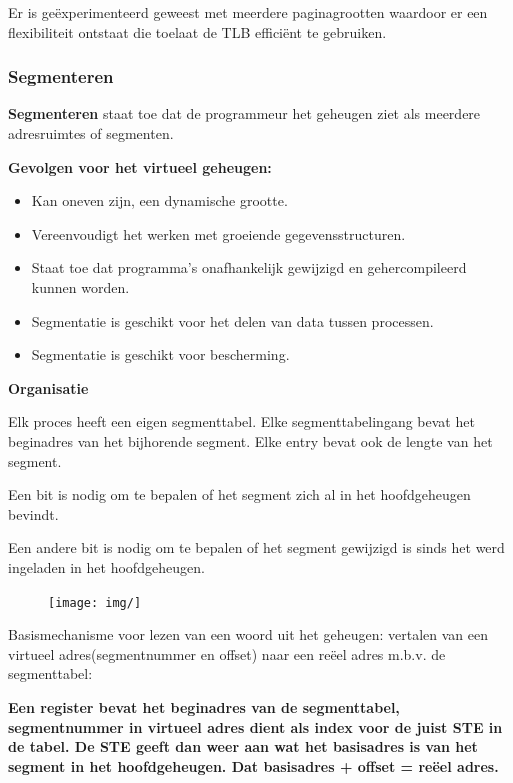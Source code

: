 Er is geëxperimenteerd geweest met meerdere paginagrootten waardoor er een flexibiliteit ontstaat die toelaat de TLB efficiënt te gebruiken.

\subsubsection{Segmenteren}

\textbf{Segmenteren} staat toe dat de programmeur het geheugen ziet als meerdere adresruimtes of segmenten.

\textbf{Gevolgen voor het virtueel geheugen:}

\begin{itemize}
\item Kan oneven zijn, een dynamische grootte.
\item Vereenvoudigt het werken met groeiende gegevensstructuren.
\item Staat toe dat programma’s onafhankelijk gewijzigd en gehercompileerd kunnen worden.
\item Segmentatie is geschikt voor het delen van data tussen processen.
\item Segmentatie is geschikt voor bescherming.
\end{itemize}

\textbf{Organisatie}

Elk proces heeft een eigen segmenttabel. Elke segmenttabelingang bevat het beginadres van het bijhorende segment. Elke entry bevat ook de lengte van het segment.

Een bit is nodig om te bepalen of het segment zich al in het hoofdgeheugen bevindt.

Een andere bit is nodig om te bepalen of het segment gewijzigd is sinds het werd ingeladen in het hoofdgeheugen.


\begin{figure}[htp]
    \centering
            \texttt{[image: img/]}
        \caption{}
    \label{fig:}
\end{figure}

Basismechanisme voor lezen van een woord uit het geheugen: vertalen van een virtueel adres(segmentnummer en offset) naar een reëel adres m.b.v. de segmenttabel:

\textbf{Een register bevat het beginadres van de segmenttabel, segmentnummer in virtueel adres dient als index voor de juist STE in de tabel. De STE geeft dan weer aan wat het basisadres is van het segment in het hoofdgeheugen. Dat basisadres + offset = reëel adres.}


